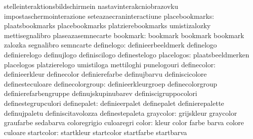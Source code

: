                                   stelleinteraktionsbildschirmein  nastavinterakcniobrazovku
                                  impostaschermointerazione        seteazaecraninteractiune
                  placebookmarks: plaatsbookmarks                  placebookmarks
                                  platzierebookmarks               umistizalozky
                                  mettisegnalibro                  plaseazasemnecarte
                        bookmark: bookmark                         bookmark
                                  bookmark                         zalozka
                                  segnalibro                       semncarte
                      definelogo: definieerbeeldmerk               definelogo
                                  definierelogo                    definujlogo
                                  definiscilogo                    definestelogo
                      placelogos: plaatsbeeldmerken                placelogos
                                  platzierelogo                    umistiloga
                                  mettiloghi                       punelogouri
                    definecolor:  definieerkleur                   definecolor
                                  definierefarbe                   definujbarvu
                                  definiscicolore                  definesteculoare
               definecolorgroup:  definieerkleurgroep              definecolorgroup
                                  definierefarbengruppe            definujskupinubarev
                                  definiscigruppocolori            definestegrupculori
                    definepalet:  definieerpalet                   definepalet
                                  definierepalette                 definujpaletu
                                  definiscitavolozza               definestepaleta
                      graycolor:  grijskleur                       graycolor
                                  graufarbe                        sedabarva
                                  coloregrigio                     culoaregri
                          color:  kleur                            color
                                  farbe                            barva
                                  colore                           culoare
                     startcolor:  startkleur                       startcolor
                                  startfarbe                       startbarva
